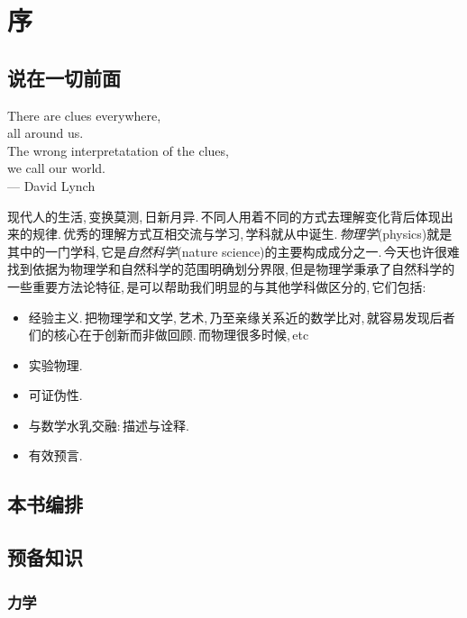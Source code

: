\chapter{序}

\section{说在一切前面}

\begin{altverse}
\centering \large

There are clues everywhere,\\
 all around us.\\
The wrong interpretatation of the clues,\\
 we call our world.\\
---  David Lynch\\
\end{altverse}

现代人的生活,\,变换莫测,\,日新月异.\,不同人用着不同的方式去理解变化背后体现出来的规律.\,优秀的理解方式互相交流与学习,\,学科就从中诞生.\,\emph{物理学}(physics)就是其中的一门学科,\,它是\emph{自然科学}(nature science)的主要构成成分之一.\,今天也许很难找到依据为物理学和自然科学的范围明确划分界限,\,但是物理学秉承了自然科学的一些重要方法论特征,\,是可以帮助我们明显的与其他学科做区分的,\,它们包括:
\begin{itemize}
\item 经验主义.\,把物理学和文学,\,艺术,\,乃至亲缘关系近的数学比对,\,就容易发现后者们的核心在于创新而非做回顾.\,而物理很多时候,\,etc
\item 实验物理.\,
\item 可证伪性.\,
\item 与数学水乳交融:\,描述与诠释.\,
\item 有效预言.\,
\end{itemize}


\section{本书编排}

\section{预备知识}

\subsection{力学}

